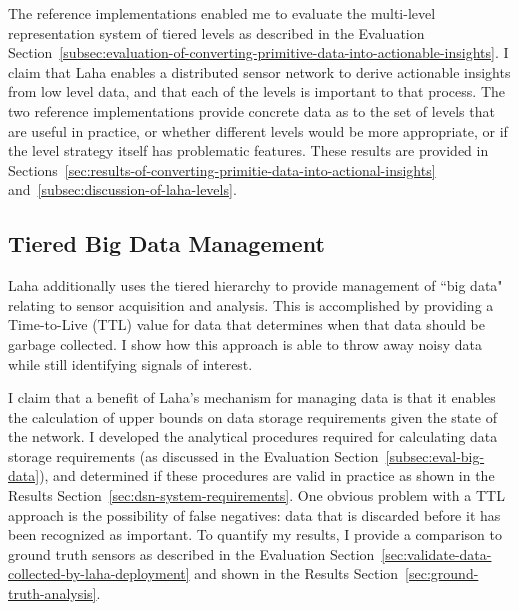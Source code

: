 The reference implementations enabled me to evaluate the multi-level representation system of tiered levels as described in the Evaluation Section~\ref{subsec:evaluation-of-converting-primitive-data-into-actionable-insights}. I claim that Laha enables a distributed sensor network to derive actionable insights from low level data, and that each of the levels is important to that process. The two reference implementations provide concrete data as to the set of levels that are useful in practice, or whether different levels would be more appropriate, or if the level strategy itself has problematic features. These results are provided in Sections~\ref{sec:results-of-converting-primitie-data-into-actional-insights} and~\ref{subsec:discussion-of-laha-levels}.

\subsection{Tiered Big Data Management}\label{subsec:tiered-big-data-management}
Laha additionally uses the tiered hierarchy to provide management of ``big data" relating to sensor acquisition and analysis. This is accomplished by providing a Time-to-Live (TTL) value for data that determines when that data should be garbage collected. I show how this approach is able to throw away noisy data while still identifying signals of interest.

I claim that a benefit of Laha's mechanism for managing data is that it enables the calculation of upper bounds on data storage requirements given the state of the network. I developed the analytical procedures required for calculating data storage requirements (as discussed in the Evaluation Section~\ref{subsec:eval-big-data}), and determined if these procedures are valid in practice as shown in the Results Section~\ref{sec:dsn-system-requirements}. One obvious problem with a TTL approach is the possibility of false negatives: data that is discarded before it has been recognized as important. To quantify my results, I provide a comparison to ground truth sensors as described in the Evaluation Section~\ref{sec:validate-data-collected-by-laha-deployment} and shown in the Results Section~\ref{sec:ground-truth-analysis}.

